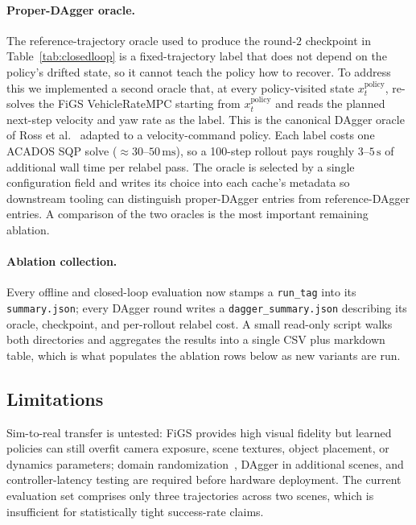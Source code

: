 \documentclass[10pt,twocolumn,letterpaper]{article}
\begin{document}
\paragraph{Proper-DAgger oracle.} The reference-trajectory oracle used to produce the round-$2$ checkpoint in Table~\ref{tab:closedloop} is a fixed-trajectory label that does not depend on the policy's drifted state, so it cannot teach the policy how to recover.  To address this we implemented a second oracle that, at every policy-visited state $x_t^{\text{policy}}$, re-solves the FiGS VehicleRateMPC starting from $x_t^{\text{policy}}$ and reads the planned next-step velocity and yaw rate as the label.  This is the canonical DAgger oracle of Ross et al.~\cite{ross2011reduction} adapted to a velocity-command policy.  Each label costs one ACADOS SQP solve (${\approx}30$--$50\,\mathrm{ms}$), so a 100-step rollout pays roughly $3$--$5\,\mathrm{s}$ of additional wall time per relabel pass.  The oracle is selected by a single configuration field and writes its choice into each cache's metadata so downstream tooling can distinguish proper-DAgger entries from reference-DAgger entries.  A comparison of the two oracles is the most important remaining ablation.

\paragraph{Ablation collection.}  Every offline and closed-loop evaluation now stamps a \texttt{run\_tag} into its \texttt{summary.json}; every DAgger round writes a \texttt{dagger\_summary.json} describing its oracle, checkpoint, and per-rollout relabel cost.  A small read-only script walks both directories and aggregates the results into a single CSV plus markdown table, which is what populates the ablation rows below as new variants are run.

\subsection{Limitations}

Sim-to-real transfer is untested: FiGS provides high visual fidelity but learned policies can still overfit camera exposure, scene textures, object placement, or dynamics parameters; domain randomization~\cite{tobin2017domain}, DAgger in additional scenes, and controller-latency testing are required before hardware deployment. The current evaluation set comprises only three trajectories across two scenes, which is insufficient for statistically tight success-rate claims.
\end{document}
